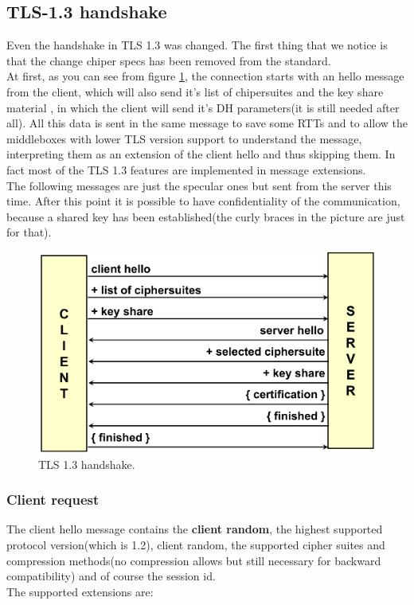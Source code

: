 \subsection{TLS-1.3 handshake}
Even the handshake in TLS 1.3 was changed. The first thing that we
notice is that the change chiper specs has been removed from the
standard.\\
At first, as you can see from figure \ref{fig:tls-1.3-handshake}, the
connection starts with an hello message from the client, which will
also send it's list of chipersuites and the key share material , in
which the client will send it's DH parameters(it is still needed after
all). All this data is sent in the same message to save some RTTs and
to allow the middleboxes with lower TLS version support to understand 
the message, interpreting them as an extension of the client hello and
thus skipping them. In fact most of the TLS 1.3 features are 
implemented in message extensions.\\
The following messages are just the specular ones but sent from the
server this time. After this point it is possible to have
confidentiality of the communication, because a shared key has been
established(the curly braces in the picture are just for that).\\

\begin{figure}[H]
  \centering
  \includegraphics[width=.6\textwidth]{img/TLS 1-3 handshake.png}
  \caption{TLS 1.3 handshake.}
  \label{fig:tls-1.3-handshake}
\end{figure}

\subsubsection{Client request}
The client hello message contains the \textbf{client random}, the
highest supported protocol version(which is 1.2), client random, the
supported cipher suites and compression methods(no compression allows
but still necessary for backward compatibility) and of course the
session id.\\
The supported extensions are: 


